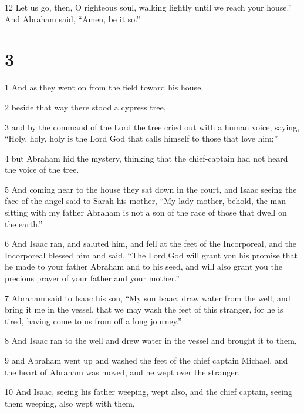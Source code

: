 \par 12 Let us go, then, O righteous soul, walking lightly until we reach your house.” And Abraham said, “Amen, be it so.”


\chapter{3}

\par 1 And as they went on from the field toward his house, 

\par 2 beside that way there stood a cypress tree, 

\par 3 and by the command of the Lord the tree cried out with a human voice, saying, “Holy, holy, holy is the Lord God that calls himself to those that love him;” 

\par 4 but Abraham hid the mystery, thinking that the chief-captain had not heard the voice of the tree. 

\par 5 And coming near to the house they sat down in the court, and Isaac seeing the face of the angel said to Sarah his mother, “My lady mother, behold, the man sitting with my father Abraham is not a son of the race of those that dwell on the earth.” 

\par 6 And Isaac ran, and saluted him, and fell at the feet of the Incorporeal, and the Incorporeal blessed him and said, “The Lord God will grant you his promise that he made to your father Abraham and to his seed, and will also grant you the precious prayer of your father and your mother.” 

\par 7 Abraham said to Isaac his son, “My son Isaac, draw water from the well, and bring it me in the vessel, that we may wash the feet of this stranger, for he is tired, having come to us from off a long journey.” 

\par 8 And Isaac ran to the well and drew water in the vessel and brought it to them, 

\par 9 and Abraham went up and washed the feet of the chief captain Michael, and the heart of Abraham was moved, and he wept over the stranger. 

\par 10 And Isaac, seeing his father weeping, wept also, and the chief captain, seeing them weeping, also wept with them, 

